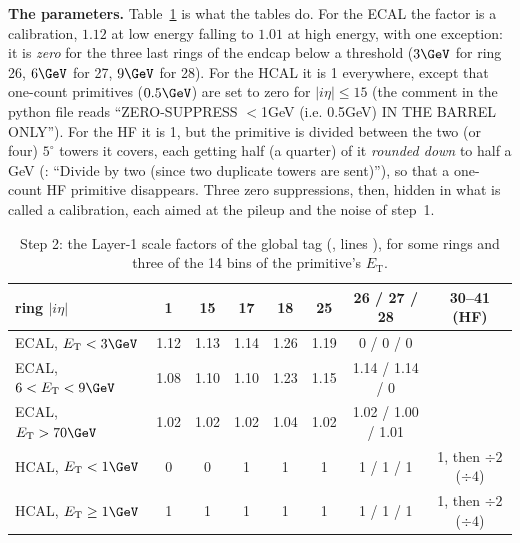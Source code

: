 \textbf{The parameters.} Table~\ref{tab:12_sf} is what the tables do. For the ECAL the factor is a calibration,
$1.12$ at low energy falling to $1.01$ at high energy, with one exception: it is \emph{zero} for the three last
rings of the endcap below a threshold ($3\GeV$ for ring 26, $6\GeV$ for 27, $9\GeV$ for 28). For the HCAL it is 1
everywhere, except that one-count primitives ($0.5\GeV$) are set to zero for $|i\eta|\leq15$ (the comment in the
python file reads ``ZERO-SUPPRESS $<$1GeV (i.e. 0.5GeV) IN THE BARREL ONLY''). For the HF it is 1, but the
primitive is divided between the two (or four) $5^\circ$ towers it covers, each getting half (a quarter) of it
\emph{rounded down} to half a GeV (: ``Divide by two
(since two duplicate towers are sent)''), so that a one-count HF primitive disappears. Three zero suppressions,
then, hidden in what is called a calibration, each aimed at the pileup and the noise of step~1.

\begin{table}[!htb]
\centering\small\setlength{\tabcolsep}{4.5pt}
\caption{Step 2: the Layer-1 scale factors of the global tag (, lines
), for some rings and three of the 14 bins of the primitive's $E_{\mathrm T}$.}
\label{tab:12_sf}
\begin{tabular}{l ccccccc}
\toprule
ring $|i\eta|$ & 1 & 15 & 17 & 18 & 25 & 26 / 27 / 28 & 30--41 (HF) \\
\midrule
ECAL, $E_{\mathrm T}<3\GeV$ & 1.12 & 1.13 & 1.14 & 1.26 & 1.19 & 0 / 0 / 0 & \\
ECAL, $6<E_{\mathrm T}<9\GeV$ & 1.08 & 1.10 & 1.10 & 1.23 & 1.15 & 1.14 / 1.14 / 0 & \\
ECAL, $E_{\mathrm T}>70\GeV$ & 1.02 & 1.02 & 1.02 & 1.04 & 1.02 & 1.02 / 1.00 / 1.01 & \\
HCAL, $E_{\mathrm T}<1\GeV$ & 0 & 0 & 1 & 1 & 1 & 1 / 1 / 1 & 1, then $\div2$ ($\div4$) \\
HCAL, $E_{\mathrm T}\geq1\GeV$ & 1 & 1 & 1 & 1 & 1 & 1 / 1 / 1 & 1, then $\div2$ ($\div4$) \\
\bottomrule
\end{tabular}
\end{table}


